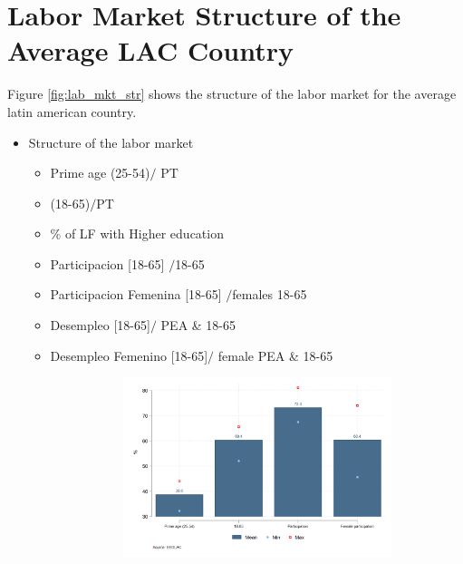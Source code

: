 \documentclass[english]{article}
\begin{document}
\section{Labor Market Structure of the Average LAC Country}
Figure \ref{fig:lab_mkt_str} shows the structure of the labor market for the average latin american country. 
\begin{itemize}
    \item Structure of the labor market 
    \begin{itemize}
        \item Prime age (25-54)$/$ PT
        \item (18-65)$/$PT
        \item \% of LF with Higher education
        \item Participacion [18-65] $/$18-65
        \item Participacion Femenina [18-65] $/$females 18-65
        \item Desempleo [18-65]$/$ PEA \& 18-65
        \item Desempleo Femenino [18-65]$/$ female PEA \& 18-65
\begin{figure}[!htb]
\centering
  \caption{Structure of labor market last year available}
\begin{subfigure}{.5\textwidth}
  \centering
  \includegraphics[width=1\linewidth]{latex/figures/Snapshot/Structure of labor market_a.png}
  \label{fig:labmarket1}
\end{subfigure}%
\begin{subfigure}{.5\textwidth}

\end{subfigure}
\end{figure}
\end{itemize}
\end{itemize}
\end{document}
